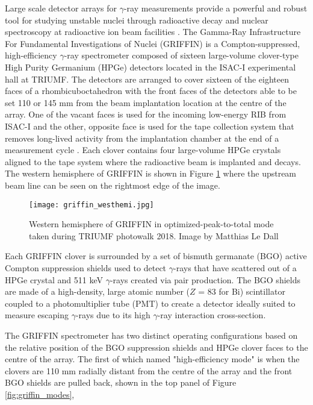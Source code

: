 \documentclass[cnatzke_thesis_proposal.tex]{subfiles}
\begin{document}
Large scale detector arrays for $\gamma$-ray measurements provide a powerful and robust tool for studying unstable nuclei through radioactive decay and nuclear spectroscopy at radioactive ion beam facilities \cite{garnsworthy_griffin_2019}. 
The Gamma-Ray Infrastructure For Fundamental Investigations of Nuclei (GRIFFIN) is a Compton-suppressed, high-efficiency $\gamma$-ray spectrometer composed of sixteen large-volume clover-type High Purity Germanium (HPGe) detectors located in the ISAC-I experimental hall at TRIUMF. 
The detectors are arranged to cover sixteen of the eighteen faces of a rhombicuboctahedron with the front faces of the detectors able to be set 110 or 145 mm from the beam implantation location at the centre of the array. 
One of the vacant faces is used for the incoming low-energy RIB from ISAC-I and the other, opposite face is used for the tape collection system that removes long-lived activity from the implantation chamber at the end of a measurement cycle \cite{garnsworthy_griffin_2019}. Each clover contains four large-volume HPGe crystals aligned to the tape system where the radioactive beam is implanted and decays. 
The western hemisphere of GRIFFIN is shown in Figure \ref{fig:griffin_westhemi} where the upstream beam line can be seen on the rightmost edge of the image. 

\begin{center}
  \begin{figure}[H]
    \begin{center}
      \texttt{[image: griffin\_westhemi.jpg]}
    \end{center}
    \caption{Western hemisphere of GRIFFIN in optimized-peak-to-total mode taken during TRIUMF photowalk 2018. Image by Matthias Le Dall}
    \label{fig:griffin_westhemi}
  \end{figure}
\end{center}

Each GRIFFIN clover is surrounded by a set of bismuth germanate (BGO) active Compton suppression shields used to detect $\gamma$-rays that have scattered out of a HPGe crystal and 511 keV $\gamma$-rays created via pair production. 
The BGO shields are made of a high-density, large atomic number ($Z$ = 83 for Bi) scintillator coupled to a photomultiplier tube (PMT) to create a detector ideally suited to measure escaping $\gamma$-rays due to its high $\gamma$-ray interaction cross-section. 

The GRIFFIN spectrometer has two distinct operating configurations based on the relative position of the BGO suppression shields and HPGe clover faces to the centre of the array. 
The first of which named "high-efficiency mode" is when the clovers are 110 mm radially distant from the centre of the array and the front BGO shields are pulled back, shown in the top panel of Figure \ref{fig:griffin_modes}, 
\end{document}
